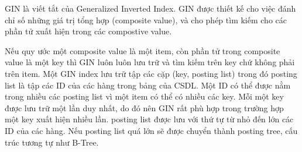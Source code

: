 GIN là viết tắt của Generalized Inverted Index. GIN được thiết
kế cho việc đánh chỉ số những giá trị tổng hợp (composite value),
và cho phép tìm kiếm cho các phần tử xuất hiện
trong các compostive value. 

Nếu quy ước một composite value là một item, còn phần tử trong
composite value là một key thì GIN 
luôn luôn lưu trữ và tìm kiếm trên key chứ không phải trên item.
Một GIN index lưu trữ tập các cặp (key, posting list) trong đó
posting list là tập các ID của các hàng trong bảng của CSDL.
Một ID có thể được nằm trong nhiều các posting list vì một
item có thể có nhiều các key. Mỗi một key được lưu trữ một
lần duy nhất, do đó nên GIN rất phù hợp trong trường hợp một
key xuất hiện nhiều lần. posting list được lưu với thứ tự
từ nhỏ đến lớn các ID của các hàng. Nếu posting list quá lớn
sẽ được chuyển thành posting tree, cấu trúc tương tự như B-Tree. 
